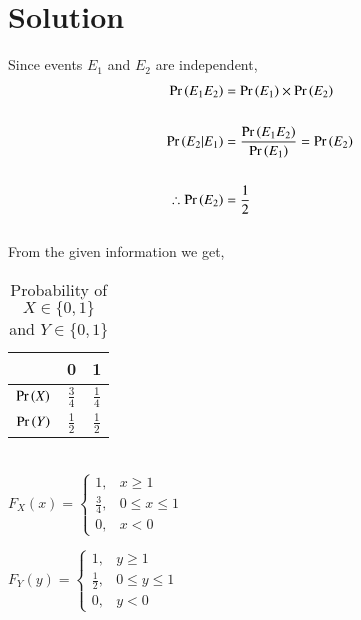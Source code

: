 \documentclass[journal,12pt,twocolumn]{IEEEtran}
\begin{document}
\section*{Solution}
Since events $E_1$ and $E_2$ are independent, 
\begin{align}
    \Pr\left(E_1E_2\right)&=\Pr\left(E_1\right)\times\Pr\left(E_2\right) \nonumber\\\nonumber\\
    \Pr\left(E_2|E_1\right)&=\frac{\Pr\left(E_1E_2\right)}{\Pr\left(E_1\right)} = \Pr\left(E_2\right) \nonumber\\ \nonumber\\
     \therefore \Pr\left(E_2\right) &= \frac{1}{2}
\end{align}
\\[1000pt]
From the given information we get,\\
\begin{table}[h]
\centering
    \begin{tabular}{|c|c|c|}
        \hline
         &0 &1    \\ \hline
        $\Pr\left(X\right)$ &$\frac{3}{4}$ &$\frac{1}{4}$   \\ \hline
        $\Pr\left(Y\right)$ &$\frac{1}{2}$ &$\frac{1}{2}$ \\ \hline
    \end{tabular}
\caption{Probability of $X \in \{0,1\}$ and $Y \in \{0,1\}$}
\label{table=1}
\end{table}
\\
$F_X(x)=
\begin{cases}
1, &x\geq1\\
\frac{3}{4}, & 0\leq x \leq1\\
0, &x<0
\end{cases}$

$F_Y(y)=
\begin{cases}
1, &y\geq1\\
\frac{1}{2}, & 0\leq y \leq1\\
0, &y<0
\end{cases}$
\\
\end{document}

